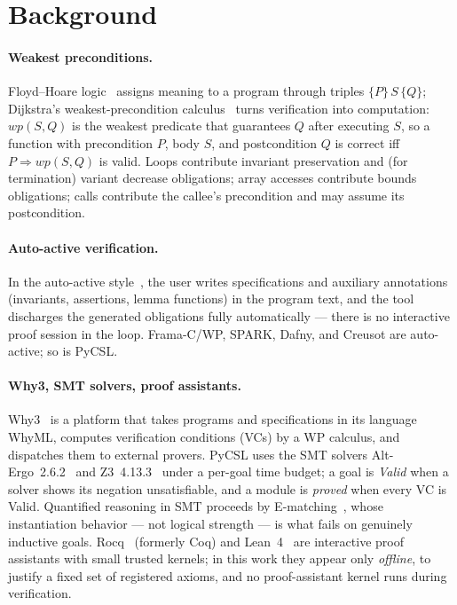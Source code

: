 \documentclass[11pt]{article}
\newcommand{\pycsl}{\textsf{PyCSL}}
\newcommand{\whyml}{\textsf{WhyML}}
\newcommand{\why}{\textsf{Why3}}
\newcommand{\altergo}{\textsf{Alt-Ergo}}
\newcommand{\zthree}{\textsf{Z3}}
\newcommand{\rocq}{\textsf{Rocq}}
\newcommand{\lean}{\textsf{Lean}}
\begin{document}
\section{Background}

\paragraph{Weakest preconditions.}
Floyd--Hoare logic~\cite{hoare} assigns meaning to a program through triples
$\{P\}\,S\,\{Q\}$; Dijkstra's weakest-precondition calculus~\cite{dijkstra}
turns verification into computation: $\mathit{wp}(S, Q)$ is the weakest
predicate that guarantees $Q$ after executing $S$, so a function with
precondition $P$, body $S$, and postcondition $Q$ is correct iff
$P \Rightarrow \mathit{wp}(S, Q)$ is valid. Loops contribute invariant
preservation and (for termination) variant decrease obligations; array
accesses contribute bounds obligations; calls contribute the callee's
precondition and may assume its postcondition.

\paragraph{Auto-active verification.}
In the auto-active style~\cite{autoactive}, the user writes specifications
and auxiliary annotations (invariants, assertions, lemma functions) in the
program text, and the tool discharges the generated obligations fully
automatically --- there is no interactive proof session in the loop. Frama-C/WP,
SPARK, Dafny, and Creusot are auto-active; so is \pycsl{}.

\paragraph{Why3, SMT solvers, proof assistants.}
\why{}~\cite{why3,why3boogie} is a platform that takes programs and
specifications in its language \whyml{}, computes verification conditions
(VCs) by a WP calculus, and dispatches them to external provers. \pycsl{}
uses the SMT solvers \altergo{}~2.6.2~\cite{altergo} and
\zthree{}~4.13.3~\cite{z3} under a per-goal time budget; a goal is
\emph{Valid} when a solver shows its negation unsatisfiable, and a module is
\emph{proved} when every VC is Valid. Quantified reasoning in SMT proceeds by
E-matching~\cite{simplify}, whose instantiation behavior --- not logical
strength --- is what fails on genuinely inductive goals.
\rocq{}~\cite{rocq} (formerly Coq) and \lean{}~4~\cite{lean4} are interactive
proof assistants with small trusted kernels; in this work they appear only
\emph{offline}, to justify a fixed set of registered axioms, and no
proof-assistant kernel runs during verification.
\end{document}
